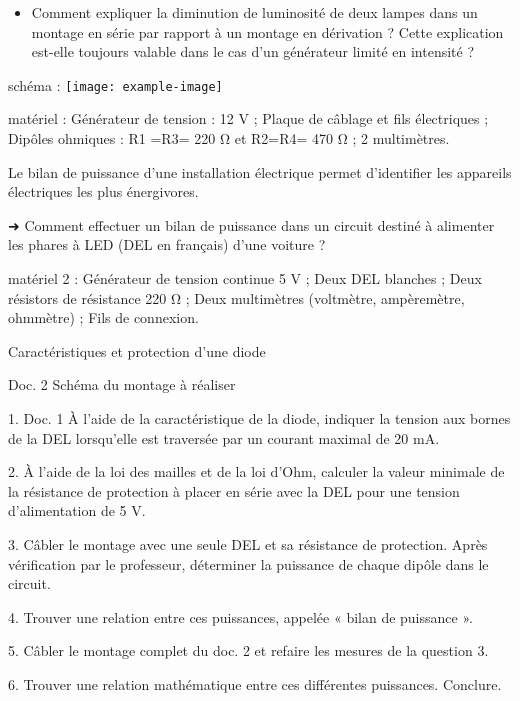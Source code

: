 \documentclass[10pt]{article}
\begin{document}
\begin{center}

	\begin{itemize}
		\item  Comment expliquer la diminution de luminosité de deux lampes dans un montage en série par rapport à un montage en dérivation ?
		      Cette explication est-elle toujours valable dans le cas d'un générateur limité en intensité ?
	\end{itemize}

	schéma : \texttt{[image:  example-image]}


	matériel :
	Générateur de tension : 12 V ;
	Plaque de câblage et fils électriques ;
	Dipôles ohmiques : R1​ =R3​= 220 Ω et R2​=R4​= 470 Ω ;
	2 multimètres.





\end{center}
\begin{center}



	Le bilan de puissance d’une installation électrique permet d’identifier les appareils électriques
	les plus énergivores.

	➜ Comment effectuer un bilan de puissance dans un circuit destiné à alimenter
	les phares à LED (DEL en français) d’une voiture ?

	matériel 2 :
	Générateur de tension continue 5 V ;
	Deux DEL blanches ;
	Deux résistors de résistance 220 Ω ;
	Deux multimètres (voltmètre, ampèremètre, ohmmètre) ;
	Fils de connexion.


	Caractéristiques et protection d’une diode

	Doc. 2
	Schéma du montage à réaliser

	1. Doc. 1 À l’aide de la caractéristique de la diode, indiquer la tension aux bornes de la DEL lorsqu’elle est traversée par un courant maximal de 20 mA.


	2. À l’aide de la loi des mailles et de la loi d’Ohm, calculer la valeur minimale de la résistance de protection à placer en série avec la DEL pour une tension d’alimentation de 5 V.


	3. Câbler le montage avec une seule DEL et sa résistance de protection. Après vérification par le professeur, déterminer la puissance de chaque dipôle dans le circuit.


	4. Trouver une relation entre ces puissances, appelée « bilan de puissance ».

	5. Câbler le montage complet du doc. 2 et refaire les mesures de la question 3.


	6. Trouver une relation mathématique entre ces différentes puissances. Conclure.
\end{center}
\end{document}
